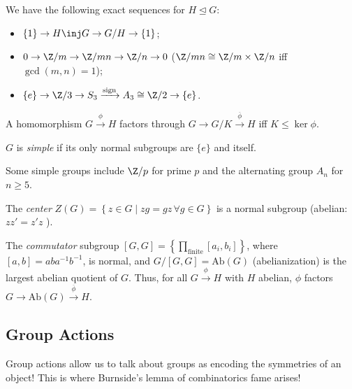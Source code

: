 \documentclass{notes}
\begin{document}
\begin{example}
    We have the following exact sequences for $H\trianglelefteq G$:
    \begin{itemize}
        \item $\{1\}\to H\inj G\to G/H\to \{1\}$;
        \item $0\to \Z /m\to \Z /mn\to \Z /n\to 0$ ($\Z /mn\cong \Z /m\times \Z /n$ iff $\gcd(m,n)=1$);
        \item $\{e\}\to \Z/3\to S_3\xrightarrow{\text{sign}}A_3\cong \Z /2\to \{e\}$.
    \end{itemize}
\end{example}

\begin{theorem}
    A homomorphism $G\xrightarrow{\phi }H$ factors through $G\to G/K\xrightarrow{\overline{\phi }}H$ iff $K\le \ker \phi $.
\end{theorem}

\begin{defn}
    $G$ is \emph{simple} if its only normal subgroups are $\{e\}$ and itself.
\end{defn}

 \begin{example}
    Some simple groups include $\Z /p$ for prime $p$ and the alternating group $A_n$ for $n\ge 5$.
\end{example}

\begin{example}
    The \emph{center} $Z(G)=\left\{ z\in G \mid  zg=gz\,\forall g\in G \right\} $ is a normal subgroup (abelian: $zz'=z'z$ ).
\end{example}

\begin{example}
    The \emph{commutator} subgroup $[G,G]=\left\{ \prod_{\text{finite}} {[a_i,b_i]}  \right\}$, where $[a,b]=aba^{-1}b^{-1}$, is normal, and $G/[G,G]=\text{Ab}(G)$ (abelianization) is the largest abelian quotient of $G$. Thus, for all $G\xrightarrow{\phi }H$ with $H$ abelian, $\phi $ factors $G\to \text{Ab}(G)\xrightarrow{\overline{\phi }}H$.
\end{example}

\subsection{Group Actions}

Group actions allow us to talk about groups as encoding the symmetries of an object! This is where Burnside's lemma of combinatorics fame arises!
\end{document}
